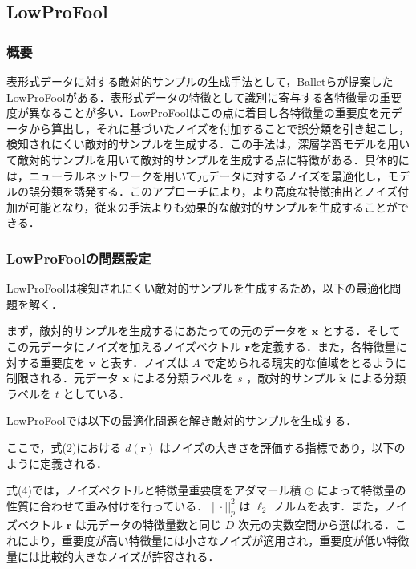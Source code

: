\subsection{LowProFool}
\subsubsection{概要}
表形式データに対する敵対的サンプルの生成手法として，Balletらが提案したLowProFool\cite{ballet2019imperceptible}がある．表形式データの特徴として識別に寄与する各特徴量の重要度が異なることが多い．LowProFoolはこの点に着目し各特徴量の重要度を元データから算出し，それに基づいたノイズを付加することで誤分類を引き起こし，検知されにくい敵対的サンプルを生成する．この手法は，深層学習モデルを用いて敵対的サンプルを用いて敵対的サンプルを生成する点に特徴がある．具体的には，ニューラルネットワークを用いて元データに対するノイズを最適化し，モデルの誤分類を誘発する．このアプローチにより，より高度な特徴抽出とノイズ付加が可能となり，従来の手法よりも効果的な敵対的サンプルを生成することができる．

\subsubsection{LowProFoolの問題設定}
LowProFoolは検知されにくい敵対的サンプルを生成するため，以下の最適化問題を解く．

まず，敵対的サンプルを生成するにあたっての元のデータを $\bm{x}$ とする．そしてこの元データにノイズを加えるノイズベクトル $\bm{r}$を定義する．また，各特徴量に対する重要度を $\bm{v}$ と表す．ノイズは $A$ で定められる現実的な値域をとるように制限される．元データ $\bm{x}$ による分類ラベルを $s$ ，敵対的サンプル $\bm{\tilde{x}}$ による分類ラベルを $t$ としている．

LowProFoolでは以下の最適化問題を解き敵対的サンプルを生成する．

ここで，式(2)における $d(\bm{r})$ はノイズの大きさを評価する指標であり，以下のように定義される．

式(4)では，ノイズベクトルと特徴量重要度をアダマール積 $\odot$ によって特徴量の性質に合わせて重み付けを行っている． $||\cdot||^2_p$ は $\ell_2$ ノルムを表す．また，ノイズベクトル $\bm{r}$ は元データの特徴量数と同じ $D$ 次元の実数空間から選ばれる．これにより，重要度が高い特徴量には小さなノイズが適用され，重要度が低い特徴量には比較的大きなノイズが許容される．

